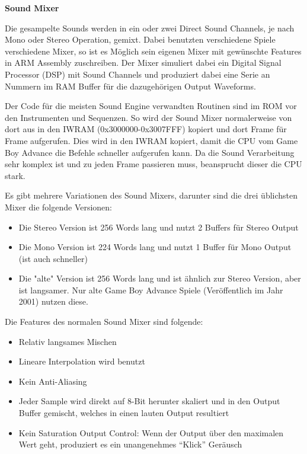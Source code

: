 \documentclass[11pt,a4paper]{scrartcl}
\newcommand{\paratitle}[1] {
    \vspace{5mm}
    \large \textbf{#1} \normalsize
    \vspace{2mm}\newline
}
\begin{document}
\newpage
\paratitle{Sound Mixer}

Die gesampelte Sounds werden in ein oder zwei Direct Sound Channels, je nach Mono oder Stereo Operation, gemixt. Dabei benutzten verschiedene Spiele verschiedene Mixer, so ist es M\"oglich sein eigenen Mixer mit gew\"unschte Features in ARM Assembly zuschreiben.
Der Mixer simuliert dabei ein Digital Signal Processor (DSP) mit Sound Channels und produziert dabei eine Serie an Nummern im RAM Buffer f\"ur die dazugeh\"origen Output Waveforms.

Der Code f\"ur die meisten Sound Engine verwandten Routinen sind im ROM vor den Instrumenten und Sequenzen.
So wird der Sound Mixer normalerweise von dort aus in den IWRAM (0x3000000-0x3007FFF) kopiert und dort Frame f\"ur Frame aufgerufen.
Dies wird in den IWRAM kopiert, damit die CPU vom Game Boy Advance die Befehle schneller aufgerufen kann. Da die Sound Verarbeitung sehr komplex ist und zu jeden Frame passieren muss, beansprucht dieser die CPU stark. 

Es gibt mehrere Variationen des Sound Mixers, darunter sind die drei \"ublichsten Mixer die folgende Versionen:

\begin{itemize}
\item Die Stereo Version ist 256 Words lang und nutzt 2 Buffers f\"ur Stereo Output
\item Die Mono Version ist 224 Words lang und nutzt 1 Buffer f\"ur Mono Output (ist auch schneller)
\item Die "alte" Version ist 256 Words lang und ist \"ahnlich zur Stereo Version, aber ist langsamer. Nur alte Game Boy Advance Spiele (Ver\"offentlich im Jahr 2001) nutzen diese.
\end{itemize}

Die Features des normalen Sound Mixer sind folgende:
\begin{itemize}
\item Relativ langsames Mischen
\item Lineare Interpolation wird benutzt
\item Kein Anti-Aliasing
\item Jeder Sample wird direkt auf 8-Bit herunter skaliert und in den Output Buffer gemischt, welches in einen lauten Output resultiert
\item Kein Saturation Output Control: Wenn der Output \"uber den maximalen Wert geht, produziert es ein unangenehmes "`Klick"' Ger\"ausch
\end{itemize}
\end{document}
